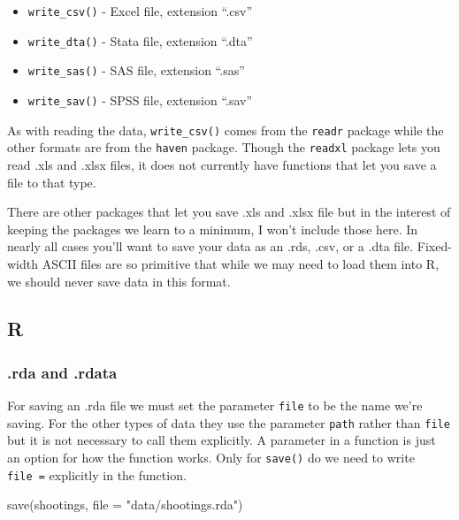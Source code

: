 \documentclass[
]{krantz}
\makeatletter
\newenvironment{Shaded}{\begin{snugshade}}{\end{snugshade}}
\newcommand{\AttributeTok}[1]{\textcolor[rgb]{0.61,0.61,0.61}{#1}}
\newcommand{\FunctionTok}[1]{\textcolor[rgb]{0,0,0}{#1}}
\newcommand{\NormalTok}[1]{#1}
\newcommand{\StringTok}[1]{\textcolor[rgb]{0.5,0.5,0.5}{#1}}
\providecommand{\tightlist}{%
  \setlength{\itemsep}{0pt}\setlength{\parskip}{0pt}}
\newenvironment{kframe}{%
\medskip{}
\setlength{\fboxsep}{.8em}
 \def\at@end@of@kframe{}%
 \ifinner\ifhmode%
  \def\at@end@of@kframe{\end{minipage}}%
  \begin{minipage}{\columnwidth}%
 \fi\fi%
 \def\FrameCommand##1{\hskip\@totalleftmargin \hskip-\fboxsep
 \colorbox{shadecolor}{##1}\hskip-\fboxsep
     \hskip-\linewidth \hskip-\@totalleftmargin \hskip\columnwidth}%
 \MakeFramed {\advance\hsize-\width
   \@totalleftmargin\z@ \linewidth\hsize
   \@setminipage}}%
 {\par\unskip\endMakeFramed%
 \at@end@of@kframe}
\renewenvironment{Shaded}{\begin{kframe}}{\end{kframe}}
\makeatother
\begin{document}
\begin{itemize}
\tightlist
\item
  \texttt{write\_csv()} - Excel file, extension ``.csv''
\item
  \texttt{write\_dta()} - Stata file, extension ``.dta''
\item
  \texttt{write\_sas()} - SAS file, extension ``.sas''
\item
  \texttt{write\_sav()} - SPSS file, extension ``.sav''
\end{itemize}

As with reading the data, \texttt{write\_csv()} comes from
the \texttt{readr} package while the other formats are from
the \texttt{haven} package. Though the \texttt{readxl}
package lets you read .xls and .xlsx files, it does not
currently have functions that let you save a file to that
type.

There are other packages that let you save .xls and .xlsx
file but in the interest of keeping the packages we learn to
a minimum, I won't include those here. In nearly all cases
you'll want to save your data as an .rds, .csv, or a .dta
file. Fixed-width ASCII files are so primitive that while we
may need to load them into R, we should never save data in
this format.

\hypertarget{r-1}{%
\subsection{R}\label{r-1}}

\hypertarget{rda-and-.rdata}{%
\subsubsection{.rda and .rdata}\label{rda-and-.rdata}}

For saving an .rda file we must set the parameter
\texttt{file} to be the name we're saving. For the other
types of data they use the parameter \texttt{path} rather
than \texttt{file} but it is not necessary to call them
explicitly. A parameter in a function is just an option for
how the function works. Only for \texttt{save()} do we need
to write \texttt{file\ =} explicitly in the function.

\begin{Shaded}
\begin{Highlighting}[]
\FunctionTok{save}\NormalTok{(shootings, }\AttributeTok{file =} \StringTok{"data/shootings.rda"}\NormalTok{)}
\end{Highlighting}
\end{Shaded}
\end{document}
